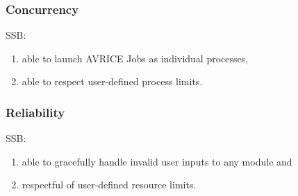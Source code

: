 \documentclass[12pt,a4paper]{article}
\begin{document}
\subsubsection{Concurrency}
SSB:
\begin{enumerate}
    \item able to launch AVRICE Jobs as individual processes,
    \item able to respect user-defined process limits.
\end{enumerate}
\subsubsection{Reliability}
SSB:
\begin{enumerate}
    \item able to gracefully handle invalid user inputs to any module and
    \item respectful of user-defined resource limits.
\end{enumerate}
\end{document}
